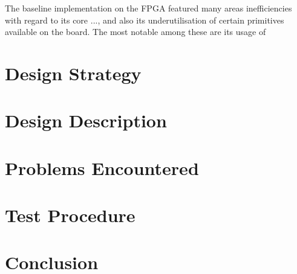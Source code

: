\documentclass[a4paper,10pt]{article}
\begin{document}
The baseline implementation on the FPGA featured many areas
inefficiencies with regard to its core ..., 
and also its underutilisation of certain primitives available on the board.
The most notable among these are its usage of 

\section{Design Strategy}
\label{sec:Design_Strategy}

\section{Design Description}
\label{sec:Design_Description}

\section{Problems Encountered}
\label{sec:Problems_Encountered}

\section{Test Procedure}
\label{sec:Test_Procedure}

\section{Conclusion}
\label{sec:Conclusion}
\end{document}
